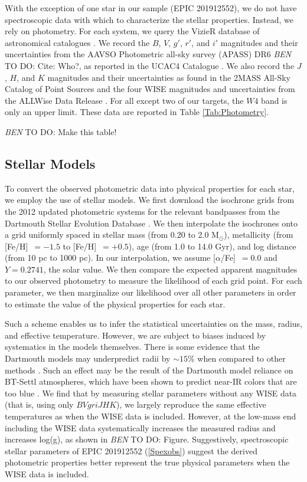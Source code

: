 \documentclass{emulateapj}
\newcommand{\msun}{{M$_\odot$}}
\newcommand{\logg}{{log(g)}}
\newcommand{\feh}{{[Fe/H]}~}
\newcommand{\afe}{{[$\alpha$/Fe]}~}
\newcommand{\todo}[3]{{\color{#2} \emph{#1} TO DO: #3}}
\newcommand{\btmtodo}[1]{\todo{BEN}{red}{#1}}
\begin{document}
With the exception of one star in our sample (EPIC 201912552), we do not have
spectroscopic data with which to characterize the stellar properties. 
Instead, we rely on photometry.
For each system, we query the VizieR database of astronomical catalogues
\citep{Ochseinbein00}. 
We record the $B$, $V$, $g'$, $r'$, and $i'$ magnitudes and their
uncertainties from the AAVSO Photometric all-sky survey (APASS) DR6 
\btmtodo{Cite: Who?}, as reported in the UCAC4 Catalogue \citep{Zacharias12}.
We also record the $J$, $H$, and $K$ magnitudes and their uncertainties 
as found in the 2MASS All-Sky Catalog of Point Sources \citep{Cutri03}
and the four WISE magnitudes and uncertainties from the ALLWise Data
Release \citep{Cutri13}.
For all except two of our targets, the $W4$ band is only an upper limit.
These data are reported in Table \ref{Tab:Photometry}.

\btmtodo{Make this table!}

\subsection{Stellar Models}
To convert the observed photometric data into physical properties for each
star, we employ the use of stellar models. 
We first download the isochrone grids from the 2012 updated photometric
systems for the relevant bandpasses from the Dartmouth Stellar Evolution
Database \citep{Dotter08}. 
We then interpolate the isochrones onto a grid uniformly spaced in
stellar mass (from 0.20 to 2.0 \msun), metallicity (from \feh$=-1.5$ to 
\feh$=+0.5$), age (from 1.0 to 14.0 Gyr), and log distance (from 10 pc to 
1000 pc). 
In our interpolation, we assume \afe$=0.0$ and $Y=0.2741$, the solar value.
We then compare the expected apparent magnitudes to our observed photometry
to measure the likelihood of each grid point.
For each parameter, we then marginalize our likelihood over all other 
parameters in order to estimate the value of the physical properties
for each star.

Such a scheme enables us to infer the statistical uncertainties on the
mass, radius, and effective temperature.
However, we are subject to biases induced by systematics in the models themselves.
There is some evidence that the Dartmouth models may underpredict 
radii by $\sim 15\%$ when compared to other methods \citep{Newton15,
Montet15}. 
Such an effect may be the result of the Dartmouth model reliance on BT-Settl
atmospheres, which have been shown to predict near-IR colors that are too blue
\citep{Thompson14}.
We find that by measuring stellar parameters without any WISE data (that is, using
only $BVgriJHK$), we largely reproduce the same effective temperatures as when
the WISE data is included. 
However, at the low-mass end including the WISE data systematically increases the 
measured radius and increases \logg, as shown in \btmtodo{Figure}.
Suggestively, spectroscopic stellar parameters of EPIC 201912552 
(\textsection\ref{Spexobs}) suggest the derived photometric properties better 
represent the true physical parameters when the WISE data is included. 
\end{document}

